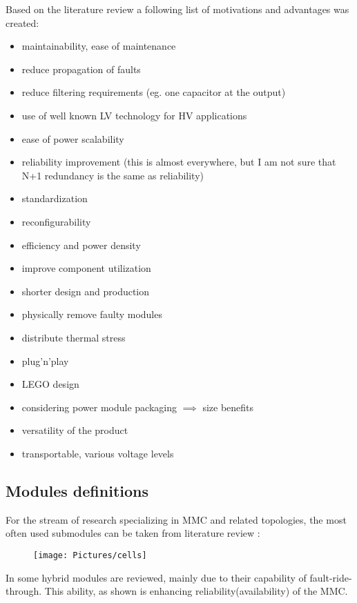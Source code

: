 \documentclass[]{scrartcl}
\begin{document}
Based on the literature review a following list of motivations and advantages was created:
\begin{itemize}
	\item maintainability, ease of maintenance
	\item reduce propagation of faults
	\item reduce filtering requirements (eg. one capacitor at the output)
	\item use of well known LV technology for HV applications 
	\item ease of power scalability
	\item reliability improvement (this is almost everywhere, but I am not sure that N+1 redundancy is the same as reliability)
	\item standardization
	\item reconfigurability 
	\item efficiency and power density
	\item improve component utilization
	\item shorter design and production
	\item physically remove faulty modules
	\item distribute thermal stress
	\item plug'n'play
	\item LEGO design
	\item considering power module packaging $\implies$ size benefits
	\item versatility of the product
	\item transportable, various voltage levels
\end{itemize}                   
\newpage
\subsection{Modules definitions}
For the stream of research specializing in MMC and related topologies, the most often used submodules can be taken from literature review \cite{Perez2014}:

\begin{figure}[h!]
	\centering
	\texttt{[image: Pictures/cells]}
	\caption{}
	\label{fig:cells}
\end{figure}




In \cite{Xu2016b} some hybrid modules are reviewed, mainly due to their capability of fault-ride-through. This ability, as shown is enhancing reliability(availability) of the MMC. 
\end{document}
